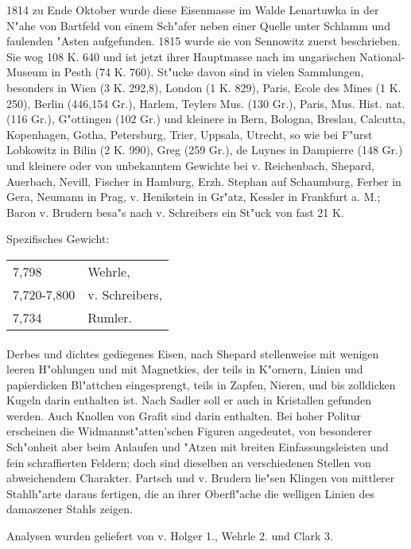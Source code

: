 \documentclass[a4paper, 11pt, oneside]{article}
\begin{document}
1814 zu Ende Oktober wurde diese Eisenmasse im Walde Lenartuwka in der N"ahe von Bartfeld von einem Sch"afer neben einer Quelle unter Schlamm und faulenden "Asten aufgefunden. 1815 wurde sie von Sennowitz zuerst beschrieben. Sie wog 108 K. 640 und ist jetzt ihrer Hauptmasse nach im ungarischen National-Museum in Pesth (74 K. 760). St"ucke davon sind in vielen Sammlungen, besonders in Wien (3 K. 292,8), London (1 K. 829), Paris, Ecole des Mines (1 K. 250), Berlin (446,154 Gr.), Harlem, Teylers Mus. (130 Gr.), Paris, Mus. Hist. nat. (116 Gr.), G"ottingen (102 Gr.) und kleinere in Bern, Bologna, Breslau, Calcutta, Kopenhagen, Gotha, Petersburg, Trier, Uppsala, Utrecht, so wie bei F"urst Lobkowitz in Bilin (2 K. 990), Greg (259 Gr.), de Luynes in Dampierre (148 Gr.) und kleinere oder von unbekanntem Gewichte bei v. Reichenbach, Shepard, Auerbach, Nevill, Fischer in Hamburg, Erzh. Stephan auf Schaumburg, Ferber in Gera, Neumann in Prag, v. Henikstein in Gr"atz, Kessler in Frankfurt a. M.; Baron v. Brudern besa"s nach v. Schreibers ein St"uck von fast 21 K.

Spezifisches Gewicht:  
\begin{table}[!ht]
    \centering
    \begin{tabular}{l l}
        7,798 & Wehrle,\\
        7,720-7,800 & v. Schreibers,\\
        7,734 & Rumler.
    \end{tabular}
\end{table}
\paragraph{}
Derbes und dichtes gediegenes Eisen, nach Shepard stellenweise mit wenigen leeren H"ohlungen und mit Magnetkies, der teils in K"ornern, Linien und papierdicken Bl"attchen eingesprengt, teils in Zapfen, Nieren, und bis zolldicken Kugeln darin enthalten ist. Nach Sadler soll er auch in Kristallen gefunden werden. Auch Knollen von Grafit sind darin enthalten. Bei hoher Politur erscheinen die Widmannst"atten'schen Figuren angedeutet, von besonderer Sch"onheit aber beim Anlaufen und "Atzen mit breiten Einfassungsleisten und fein schraffierten Feldern; doch sind dieselben an verschiedenen Stellen von abweichendem Charakter. Partsch und v. Brudern lie"sen Klingen von mittlerer Stahlh"arte daraus fertigen, die an ihrer Oberfl"ache die welligen Linien des damaszener Stahls zeigen.

Analysen wurden geliefert von v. Holger 1., Wehrle 2. und Clark 3.
\end{document}

